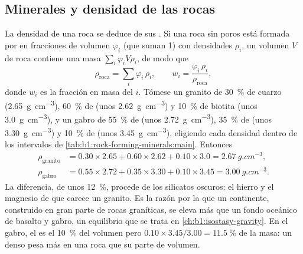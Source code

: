 \subsection{Minerales y densidad de las rocas}

La densidad de una roca se deduce de sus . Si una roca sin poros está formada por  en
fracciones de volumen $\varphi_i$ (que suman 1) con densidades $\rho_i$, un volumen $V$ de roca contiene una
masa $\sum_i \varphi_i V \rho_i$, de modo que
\[
  \rho_{\text{roca}} = \sum_i \varphi_i\,\rho_i ,
  \qquad
  w_i = \frac{\varphi_i\,\rho_i}{\rho_{\text{roca}}},
\]
donde $w_i$ es la fracción en masa del  $i$. Tómese un granito de \qty{30}{\percent} de cuarzo
(\qty{2.65}{g.cm^{-3}}), \qty{60}{\percent} de  (unos \qty{2.62}{g.cm^{-3}}) y \qty{10}{\percent} de
biotita (unos \qty{3.0}{g.cm^{-3}}), y un gabro de \qty{55}{\percent} de  (unos \qty{2.72}{g.cm^{-3}}),
\qty{35}{\percent} de  (unos \qty{3.30}{g.cm^{-3}}) y \qty{10}{\percent} de  (unos
\qty{3.45}{g.cm^{-3}}), eligiendo cada densidad dentro de los intervalos de
\cref{tab:b1:rock-forming-minerals:main}. Entonces
\begin{align*}
  \rho_{\text{granito}} &= 0.30\times2.65 + 0.60\times2.62 + 0.10\times3.0
  = \qty{2.67}{g.cm^{-3}},\\
  \rho_{\text{gabro}} &= 0.55\times2.72 + 0.35\times3.30 + 0.10\times3.45
  = \qty{3.00}{g.cm^{-3}}.
\end{align*}
La diferencia, de unos \qty{12}{\percent}, procede de los silicatos oscuros: el hierro y el magnesio de que
carece un granito. Es la razón por la que un continente, construido en gran parte de rocas graníticas, se eleva
más que un fondo oceánico de basalto y gabro, un equilibrio que se trata en \cref{ch:b1:isostasy-gravity}. En el
gabro, el  es el \qty{10}{\percent} del volumen pero $0.10\times3.45/3.00 = \qty{11.5}{\percent}$ de la
masa: un  denso pesa más en una roca que su parte de volumen.

